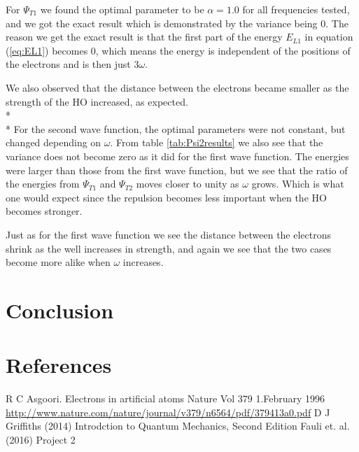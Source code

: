 \documentclass[norsk,a4paper,12pt]{article}
\begin{document}
For $\Psi_{T1}$ we found the optimal parameter to be $\alpha=1.0$ for all frequencies tested, and we got the exact result which is demonstrated by the variance being $0$. The reason we get the exact result is that the first part of the energy $E_{L1}$ in equation (\ref{eq:EL1}) becomes $0$, which means the energy is independent of the positions of the electrons and is then just $3\omega$. 

We also observed that the distance between the electrons became smaller  as the strength of the HO increased, as expected.
\\* \\* \noindent
For the second wave function, the optimal parameters were not constant, but changed depending on $\omega$. From table \ref{tab:Psi2results} we also see that the variance does not become zero as it did for the first wave function. The energies were larger than those from the first wave function, but we see that the ratio of the energies from $\Psi_{T1}$ and $\Psi_{T2}$ moves closer to unity as $\omega$ grows. Which is what one would expect since the repulsion becomes less important when the HO becomes stronger.

Just as for the first wave function we see the distance between the electrons shrink as the well increases in strength, and again we see that the two cases become more alike when $\omega$ increases.


\section{Conclusion} \label{Conclusion}

\newpage
\section{References}
\begingroup
\renewcommand{\section}[2]{}
\begin{thebibliography}{}
  R C Asgoori. 
  Electrons in artificial atoms
  Nature Vol 379 1.February 1996
  \url{http://www.nature.com/nature/journal/v379/n6564/pdf/379413a0.pdf}
  D J Griffiths (2014)
  Introdction to Quantum Mechanics, Second Edition
  Fauli et. al. (2016)
  Project 2
  
  
  

\end{thebibliography}
\end{document}
